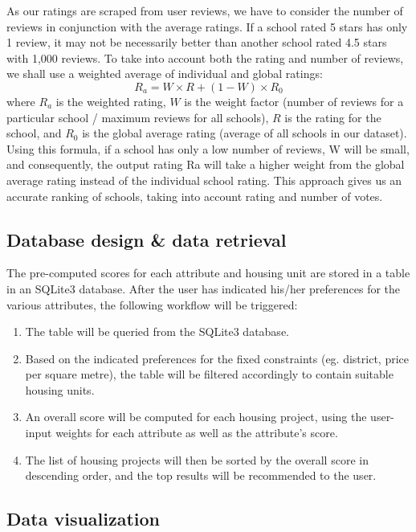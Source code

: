 \documentclass[a4paper, 11pt]{article}
\begin{document}
 As our ratings are scraped from user reviews, we have to consider the number of reviews in conjunction with the average ratings. If a school rated 5 stars has only 1 review, it may not be necessarily better than another school rated 4.5 stars with 1,000 reviews. To take into account both the rating and number of reviews, we shall use a weighted average of individual and global ratings: 
\[ R_a = W\times R +(1-W)\times R_0\] where $R_a$ is the weighted rating, $W$ is the weight factor (number of reviews for a particular school / maximum reviews for all schools), $R$ is the rating for the school, and $R_0$ is the global average rating (average of all schools in our dataset). Using this formula, if a school has only a low number of reviews, W will be small, and consequently, the output rating Ra will take a higher weight from the global average rating instead of the individual school rating. This approach gives us an accurate ranking of schools, taking into account rating and number of votes.

\subsection{Database design \& data retrieval}

The pre-computed scores for each attribute and housing unit are stored in a table in an SQLite3 database. After the user has indicated his/her preferences for the various attributes, the following workflow will be triggered:
\begin{enumerate}
    \item The table will be queried from the SQLite3 database.
    \item Based on the indicated preferences for the fixed constraints (eg. district, price per square metre), the table will be filtered accordingly to contain suitable housing units.
    \item An overall score will be computed for each housing project, using the user-input weights for each attribute as well as the attribute’s score.
    \item The list of housing projects will then be sorted by the overall score in descending order, and the top results will be recommended to the user.
\end{enumerate}

\subsection{Data visualization}
\end{document}
